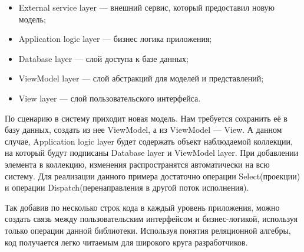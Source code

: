 \begin{itemize}
  \item External service layer --- внешний сервис, который предоставил новую модель;
  \item Application logic layer --- бизнес логика приложения;
  \item Database layer --- слой доступа к базе данных;
  \item ViewModel layer --- слой абстракций для моделей и представлений;
  \item View layer --- слой пользовательского интерфейса.
\end{itemize}

По сценарию в систему приходит новая модель. Нам требуется сохранить её в базу данных, создать из нее ViewModel, а из ViewModel --- View. А данном случае, Application logic layer будет содержать объект наблюдаемой коллекции, на который будут подписаны Database layer и ViewModel layer. При добавлении элемента в коллекцию, изменения распространятся автоматически на всю систему. Для реализации данного примера достаточно операции Select(проекции) и операции Dispatch(перенаправления в другой поток исполнения).

Так добавив по несколько строк кода в каждый уровень приложения, можно создать связь между пользовательским интерфейсом и бизнес-логикой, используя только операции данной библиотеки. Используя понятия реляционной алгебры, код получается легко читаемым для широкого круга разработчиков.
